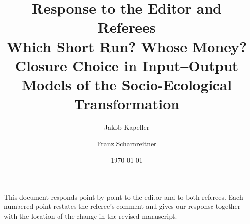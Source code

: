 \documentclass{article}
\title{Response to the Editor and Referees\\[0.3em]
\large Which Short Run? Whose Money? Closure Choice in Input--Output
Models of the Socio-Ecological Transformation}
\author{Jakob Kapeller \and Franz Scharnreitner}
\date{\today}
\begin{document}
\maketitle

\noindent This document responds point by point to the editor and to both
referees. Each numbered point restates the referee's comment and gives our
response together with the location of the change in the revised manuscript.





\printbibliography[title={References}]
\end{document}

